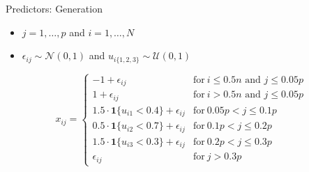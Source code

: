 \documentclass{beamer}
\providecommand{\tightlist}{%
  \setlength{\itemsep}{0pt}\setlength{\parskip}{0pt}}
\begin{document}
\begin{frame}{Predictors: Generation}
\protect\hypertarget{predictors-generation}{}
\begin{itemize}
\tightlist
\item
  \(j = 1, \ldots, p\) and \(i = 1, \ldots, N\)
\item
  \(\epsilon_{ij} \sim \mathcal{N}(0, 1)\) and
  \(u_{i\{1,2,3\}} \sim \mathcal{U}(0, 1)\)
\end{itemize}

\[
x_{ij} = \begin{cases}
-1 + \epsilon_{ij}                                   & \text{for}\ i \leq 0.5n \text{ and } j \leq 0.05p \\
1 + \epsilon_{ij}                                    & \text{for}\ i > 0.5n \text{ and } j \leq 0.05p \\
1.5 \cdot \mathbf{1}\{u_{i1} < 0.4\} + \epsilon_{ij} & \text{for}\ 0.05p < j \leq 0.1p \\
0.5 \cdot \mathbf{1}\{u_{i2} < 0.7\} + \epsilon_{ij} & \text{for}\ 0.1p < j \leq 0.2p \\
1.5 \cdot \mathbf{1}\{u_{i3} < 0.3\} + \epsilon_{ij} & \text{for}\ 0.2p < j \leq 0.3p \\
\epsilon_{ij}                                        & \text{for}\ j > 0.3p
\end{cases}
\]
\end{frame}
\end{document}
